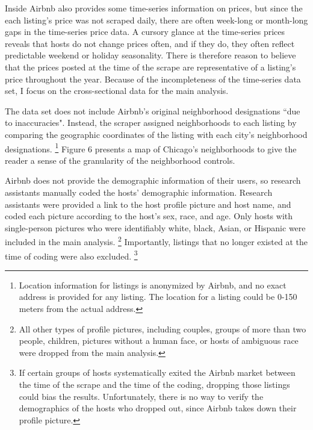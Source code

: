 
Inside Airbnb also provides some time-series information on prices, but since the each listing's price was not scraped daily, there are often week-long or month-long gaps in the time-series price data. A cursory glance at the time-series prices reveals that hosts do not change prices often, and if they do, they often reflect predictable weekend or holiday seasonality. There is therefore reason to believe that the prices posted at the time of the scrape are representative of a listing's price throughout the year. Because of the incompleteness of the time-series data set, I focus on the cross-sectional data for the main analysis.  

The data set does not include Airbnb's original neighborhood designations ``due to inaccuracies". Instead, the scraper assigned neighborhoods to each listing by comparing the geographic coordinates of the listing with each city's neighborhood designations.%
	\footnote{Location information for listings is anonymized by Airbnb, and no exact address is provided for any listing. The location for a listing could be 0-150 meters from the actual address.} 
Figure 6 presents a map of Chicago's neighborhoods to give the reader a sense of the granularity of the neighborhood controls. 

Airbnb does not provide the demographic information of their users, so research assistants manually coded the hosts' demographic information. Research assistants were provided a link to the host profile picture and host name, and coded each picture according to the host's sex, race, and age. Only hosts with single-person pictures who were identifiably white, black, Asian, or Hispanic were included in the main analysis.%
	\footnote{All other types of profile pictures, including couples, groups of more than two people, children, pictures without a human face, or hosts of ambiguous race were dropped from the main analysis.}
Importantly, listings that no longer existed at the time of coding were also excluded.%
	\footnote{If certain groups of hosts systematically exited the Airbnb market between the time of the scrape and the time of the coding, dropping those listings could bias the results. Unfortunately, there is no way to verify the demographics of the hosts who dropped out, since Airbnb takes down their profile picture.}

